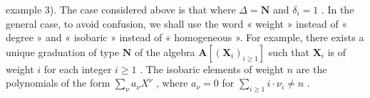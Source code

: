 example 3). The case considered above is that where \(\Delta = \mathbf{N}\) and \(\delta_{i} = 1\) . In the general case, to avoid confusion, we shall use the word « weight » instead of « degree » and « isobaric » instead of « homogeneous ». For example, there exists a unique graduation of type \(\mathbf{N}\) of the algebra \(\mathbf{A}[(\mathbf{X}_{i})_{i\geqslant 1}]\) such that \(\mathbf{X}_i\) is of weight \(i\) for each integer \(i \geqslant 1\) . The isobaric elements of weight \(n\) are the polynomials of the form \(\sum_{\nu} a_{\nu} X^{\nu}\) , where \(a_{\nu} = 0\) for \(\sum_{i \geqslant 1} i \cdot \nu_i \neq n\) .

